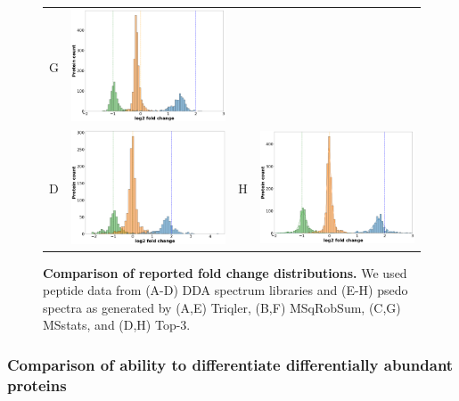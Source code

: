 \documentclass[10pt,letterpaper]{article}
\begin{document}
\begin{figure}[hbt]
\begin{tabular}{lclc}
        G & \includegraphics[width=0.4\linewidth]{../../result/report_plots/diann_msstats_intensity.png} \\ 
        D & \includegraphics[width=0.4\linewidth]{../../result/report_plots/osw_top3_intensity.png} &
        H & \includegraphics[width=0.4\linewidth]{../../result/report_plots/diann_top3_intensity.png} 
    \end{tabular}
    \caption{{\bf Comparison of reported fold change distributions.} We used peptide data from (A-D) DDA spectrum libraries and (E-H) psedo spectra as generated by 
    (A,E) Triqler, (B,F) MSqRobSum, (C,G) MSstats, and (D,H) Top-3. \label{fig:fc_histogram}}
\end{figure}

\subsubsection*{Comparison of ability to differentiate differentially abundant proteins}
\end{document}
